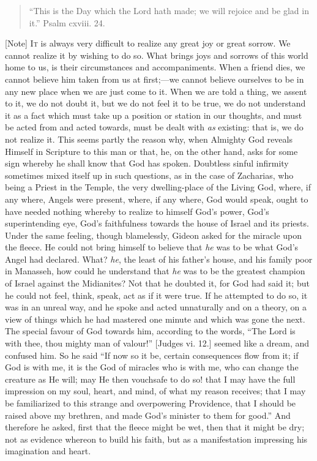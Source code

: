 \begin{quote}

``This is the Day which the Lord hath made; we will rejoice and
be glad in it.'' Psalm cxviii. 24.

\end{quote}

[Note] I\textsc{t} is always very difficult
to realize any great joy or great sorrow. We cannot realize it by
wishing to do so. What brings joys and sorrows of this world home to us,
is their circumstances and accompaniments. When a friend dies, we cannot
believe him taken from us at first;—we cannot believe ourselves to be
in any new place when we are just come to it. When we are told a thing,
we assent to it, we do not doubt it, but we do not feel it to be true,
we do not understand it as a fact which must take up a position or
station in our thoughts, and must be acted from and acted towards, must
be dealt with \emph{as} existing: that is, we do not realize it. This seems
partly the reason why, when Almighty God reveals Himself in Scripture to
this man or that, he, on the other hand, asks for some sign whereby he
shall know that God has spoken. Doubtless sinful infirmity sometimes
mixed itself up in such questions, as in the case of Zacharias, who
being a Priest in the Temple, the very dwelling-place of the Living God,
where, if any where, Angels were present, where, if any where, God would
speak, ought to have needed nothing whereby to realize to himself God's
power, God's superintending eye, God's faithfulness towards the house
of Israel and its priests. Under the same feeling, though blamelessly,
Gideon asked for the miracle upon the fleece. He could not bring himself
to believe that \emph{he} was to be what God's Angel had declared. What?
\emph{he}, the least of his father's house, and his family poor in
Manasseh, how could he understand that \emph{he} was to be the greatest
champion of Israel against the Midianites? Not that he doubted it, for
God had said it; but he could not feel, think, speak, act as if it were
true. If he attempted to do so, it was in an unreal way, and he spoke
and acted unnaturally and on a theory, on a view of things which he had
mastered one minute and which was gone the next. The special favour of
God towards him, according to the words, ``The Lord is with thee,
thou mighty man of valour!'' [Judges vi. 12.] seemed like a dream,
and confused him. So he said ``If now so it be, certain consequences
flow from it; if God is with me, it is the God of miracles who is with
me, who can change the creature as He will; may He then vouchsafe to do
so! that I may have the full impression on my soul, heart, and mind, of
what my reason receives; that I may be familiarized to this strange and
overpowering Providence, that I should be raised above my brethren, and
made God's minister to them for good.'' And therefore he asked,
first that the fleece might be wet, then that it might be dry; not as
evidence whereon to build his faith, but as a manifestation impressing
his imagination and heart.

